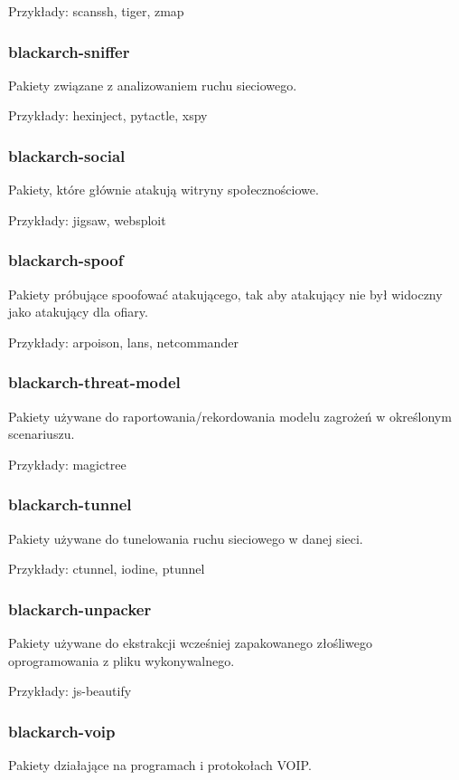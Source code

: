 \documentclass[a4paper, oneside, 11pt]{book}
\begin{document}
Przykłady: scanssh, tiger, zmap

\subsubsection{blackarch-sniffer}
Pakiety związane z analizowaniem ruchu sieciowego.

Przykłady: hexinject, pytactle, xspy

\subsubsection{blackarch-social}
Pakiety, które głównie atakują witryny społecznościowe.

Przykłady: jigsaw, websploit

\subsubsection{blackarch-spoof}
Pakiety próbujące spoofować atakującego, tak aby atakujący nie był widoczny jako atakujący dla ofiary.

Przykłady: arpoison, lans, netcommander

\subsubsection{blackarch-threat-model}
Pakiety używane do raportowania/rekordowania modelu zagrożeń w określonym scenariuszu.

Przykłady: magictree

\subsubsection{blackarch-tunnel}
Pakiety używane do tunelowania ruchu sieciowego w danej sieci.

Przykłady: ctunnel, iodine, ptunnel

\subsubsection{blackarch-unpacker}
Pakiety używane do ekstrakcji wcześniej zapakowanego złośliwego oprogramowania z pliku wykonywalnego.

Przykłady: js-beautify

\subsubsection{blackarch-voip}
Pakiety działające na programach i protokołach VOIP.
\end{document}
